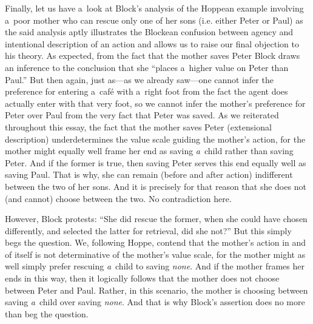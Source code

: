 


Finally, let us have a~look at Block's 
\parencite*[][pp.50–51]{block_response_2022} %
 analysis of the Hoppean example involving a~poor mother who can rescue only one of her sons (i.e. either Peter or Paul) as the said analysis aptly illustrates the Blockean confusion between agency and intentional description of an action and allows us to raise our final objection to his theory. As expected, from the fact that the mother saves Peter Block draws an inference to the conclusion that she ``places a~higher value on Peter than Paul.'' But then again, just as---as we already saw---one cannot infer the preference for entering a~café with a~right foot from the fact the agent does actually enter with that very foot, so we cannot infer the mother's preference for Peter over Paul from the very fact that Peter was saved. As we reiterated throughout this essay, the fact that the mother saves Peter (extensional description) underdetermines the value scale guiding the mother's action, for the mother might equally well frame her end as saving \textit{a}~child rather than saving Peter. And if the former is true, then saving Peter serves this end equally well as saving Paul. That is why, she can remain (before and after action) indifferent between the two of her sons. And it is precisely for that reason that she does not (and cannot) choose between the two. No contradiction here.



However, Block 
\parencite*[][pp.50–51]{block_response_2022} %
 protests: ``She did rescue the former, when she could have chosen differently, and selected the latter for retrieval, did she not?'' But this simply begs the question. We, following Hoppe, contend that the mother's action in and of itself is not determinative of the mother's value scale, for the mother might as well simply prefer rescuing \textit{a}~child to saving \textit{none}. And if the mother frames her ends in this way, then it logically follows that the mother does not choose between Peter and Paul. Rather, in this scenario, the mother is choosing between saving \textit{a}~child over saving \textit{none}. And that is why Block's assertion does no more than beg the question.



